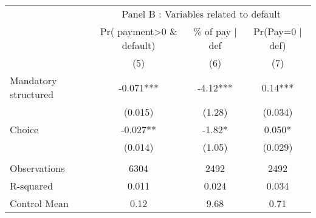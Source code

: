 \begin{tabular}{lccc}
\toprule
      & \multicolumn{3}{c}{Panel B  : Variables related to default} \\
\cmidrule{2-4}      & Pr( payment>0 \& default) & \% of pay $|$ def  & Pr(Pay=0 $|$ def) \\
\midrule
\midrule
      & (5)   & (6)   & (7) \\
\midrule
\midrule
Mandatory structured & -0.071*** & -4.12*** & 0.14*** \\
      & (0.015) & (1.28) & (0.034) \\
Choice & -0.027** & -1.82* & 0.050* \\
      & (0.014) & (1.05) & (0.029) \\
      &       &       &  \\
\midrule
Observations & 6304  & 2492  & 2492 \\
R-squared & 0.011 & 0.024 & 0.034 \\
Control Mean & 0.12  & 9.68  & 0.71 \\
\bottomrule
\bottomrule
\end{tabular}%
